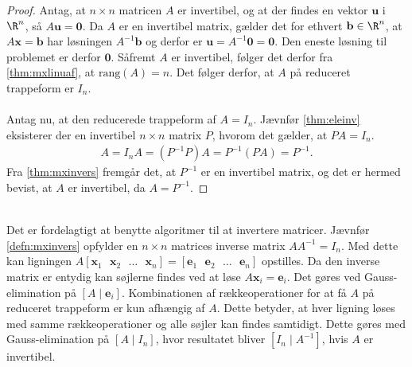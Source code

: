 \begin{proof}
Antag, at $n\times n$ matricen $A$ er invertibel, og at der findes en vektor $\textbf{u}$ i $\R^n$, så $A\textbf{u}=\textbf{0}$. 
Da $A$ er en invertibel matrix, gælder det for ethvert $\mathbf{b} \in \R^n$, at $A\textbf{x}=\mathbf{b}$ har løsningen $A^{-1}\mathbf{b}$ og derfor er $\textbf{u}=A^{-1}\textbf{0}=\textbf{0}$. 
Den eneste løsning til problemet er derfor $\textbf{0}$. 
Såfremt $A$ er invertibel, følger det derfor fra \ref{thm:mxlinuaf}, at $\text{rang}(A)=n$.
Det følger derfor, at $A$ på reduceret trappeform er $I_n$.
\\\\
Antag nu, at den reducerede trappeform af $A=I_n$. 
Jævnfør \ref{thm:eleinv} eksisterer der en invertibel $n \times n$ matrix $P$, hvorom det gælder, at $PA=I_n$. 
%
\begin{align*}
A=I_nA=(P^{-1}P)A=P^{-1}(PA)=P^{-1}.
\end{align*}
%
Fra \ref{thm:mxinvers} fremgår det, at $P^{-1}$ er en invertibel matrix, og det er hermed bevist, at $A$ er invertibel, da $A=P^{-1}$.
\end{proof}
\\
Det er fordelagtigt at benytte algoritmer til at invertere matricer.
Jævnfør \ref{defn:mxinvers} opfylder en $n \times n$ matrices inverse matrix $AA^{-1}=I_n$.
Med dette kan ligningen $A[\textbf{x}_1\text{  }\textbf{x}_2\text{  }\ldots\text{  }\textbf{x}_n ] = [\textbf{e}_1\text{  }\textbf{e}_2\text{  }\ldots\text{  }\textbf{e}_n]$ opstilles.
Da den inverse matrix er entydig kan søjlerne findes ved at løse $A\textbf{x}_i = \textbf{e}_i$.
Det gøres ved Gauss-elimination på $[A \mid \textbf{e}_i]$.
Kombinationen af rækkeoperationer for at få $A$ på reduceret trappeform er kun afhængig af $A$.
Dette betyder, at hver ligning løses med samme rækkeoperationer og alle søjler kan findes samtidigt.
Dette gøres med Gauss-elimination på $[A \mid I_n]$, hvor resultatet bliver $[I_n \mid A^{-1}]$, hvis $A$ er invertibel.\\
%
%
